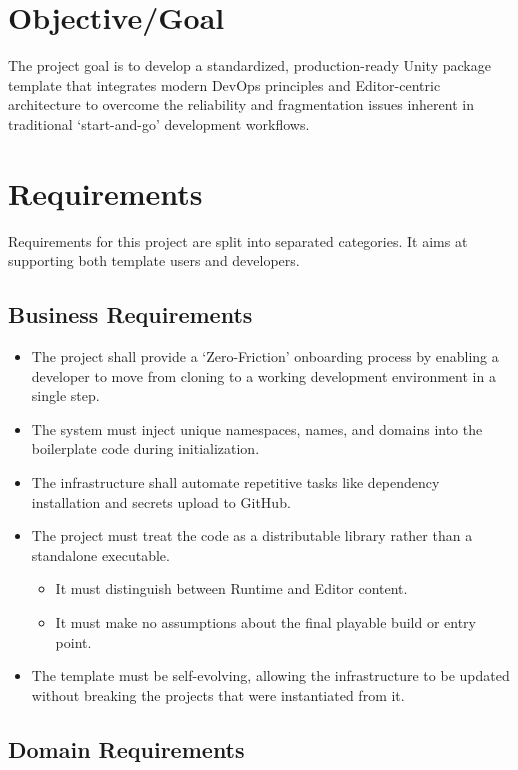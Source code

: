 \section{Objective/Goal}

The project goal is to develop a standardized, production-ready Unity package template that integrates modern DevOps principles and Editor-centric architecture to overcome the reliability and fragmentation issues inherent in traditional `start-and-go' development workflows.

\section{Requirements}

Requirements for this project are split into separated categories. It aims at supporting both template users and developers.

\subsection{Business Requirements}

\begin{itemize}
	\item The project shall provide a `Zero-Friction' onboarding process by enabling a developer to move from cloning to a working development environment in a single step.
	\item The system must inject unique namespaces, names, and domains into the boilerplate code during initialization.
	\item The infrastructure shall automate repetitive tasks like dependency installation and secrets upload to GitHub.
	\item The project must treat the code as a distributable library rather than a standalone executable.
	      \begin{itemize}
		      \item It must distinguish between Runtime and Editor content.
		      \item It must make no assumptions about the final playable build or entry point.
	      \end{itemize}
	\item The template must be self-evolving, allowing the infrastructure to be updated without breaking the projects that were instantiated from it.
\end{itemize}

\subsection{Domain Requirements}

